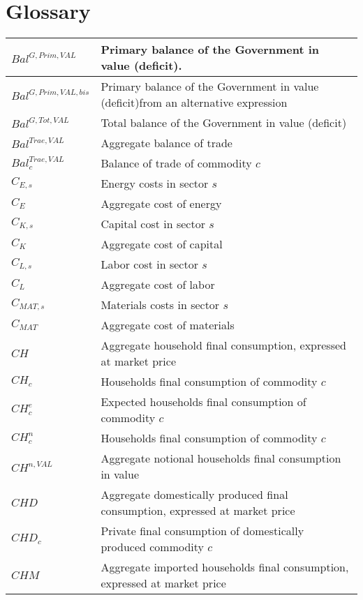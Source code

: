 \documentclass[12pt]{article}
\numberwithin{equation}{section}
\begin{document}
        \section{Glossary}
        \normalsize
        \begin{longtable}{@{}p{4cm}p{9cm}@{}} 
$Bal^{G,Prim,VAL}$ & Primary balance of the Government in value (deficit). \\
 \midrule 
$Bal^{G,Prim,VAL,bis}$ & Primary balance of the Government in value (deficit)from an alternative expression \\
 \midrule 
$Bal^{G,Tot,VAL}$ & Total balance of the Government in value (deficit) \\
 \midrule 
$Bal^{Trae,VAL}$ & Aggregate balance of trade \\
 \midrule 
$Bal^{Trae,VAL}_{c}$ & Balance of trade of commodity $c$ \\
 \midrule 
$C_{E, s}$ & Energy costs in sector $s$ \\
 \midrule 
$C_{E}$ & Aggregate cost of energy \\
 \midrule 
$C_{K, s}$ & Capital cost in sector $s$ \\
 \midrule 
$C_{K}$ & Aggregate cost of capital \\
 \midrule 
$C_{L, s}$ & Labor cost in sector $s$ \\
 \midrule 
$C_{L}$ & Aggregate cost of labor \\
 \midrule 
$C_{MAT, s}$ & Materials costs in sector $s$ \\
 \midrule 
$C_{MAT}$ & Aggregate cost of materials \\
 \midrule 
$CH$ & Aggregate household final consumption, expressed at market price \\
 \midrule 
$CH_{c}$ & Households final consumption of commodity $c$ \\
 \midrule 
$CH^{e}_{c}$ & Expected households final consumption of commodity $c$ \\
 \midrule 
$CH^{n}_{c}$ & Households  final consumption of commodity $c$ \\
 \midrule 
$CH^{n,VAL}$ & Aggregate notional households final consumption in value \\
 \midrule 
$CHD$ & Aggregate domestically produced final consumption, expressed at market price \\
 \midrule 
$CHD_{c}$ & Private final consumption of domestically produced commodity $c$ \\
 \midrule 
$CHM$ & Aggregate imported households final consumption, expressed at market price \\

\end{longtable}
\end{document}
